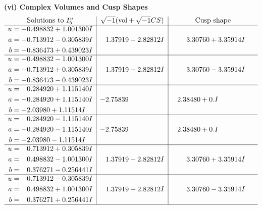 \documentclass[1p]{elsarticle_modified}
\theoremstyle{definition}
\newcommand{\I}{\sqrt{-1}}
\begin{document}
\newpage\flushleft \textbf{(vi) Complex Volumes and Cusp Shapes}
$$\begin{array}{c|c|c}  
\text{Solutions to }I^u_{5}& \I (\text{vol} + \sqrt{-1}CS) & \text{Cusp shape}\\
 \hline 
\begin{aligned}
u &= -0.498832 + 1.001300 I \\
a &= -0.713912 - 0.305839 I \\
b &= -0.836473 + 0.439023 I\end{aligned}
 & \phantom{-}1.37919 - 2.82812 I & \phantom{-}3.30760 + 3.35914 I \\ \hline\begin{aligned}
u &= -0.498832 - 1.001300 I \\
a &= -0.713912 + 0.305839 I \\
b &= -0.836473 - 0.439023 I\end{aligned}
 & \phantom{-}1.37919 + 2.82812 I & \phantom{-}3.30760 - 3.35914 I \\ \hline\begin{aligned}
u &= \phantom{-}0.284920 + 1.115140 I \\
a &= -0.284920 + 1.115140 I \\
b &= -2.03980 + 1.11514 I\end{aligned}
 & -2.75839\phantom{ +0.000000I} & \phantom{-}2.38480 + 0. I\phantom{ +0.000000I} \\ \hline\begin{aligned}
u &= \phantom{-}0.284920 - 1.115140 I \\
a &= -0.284920 - 1.115140 I \\
b &= -2.03980 - 1.11514 I\end{aligned}
 & -2.75839\phantom{ +0.000000I} & \phantom{-}2.38480 + 0. I\phantom{ +0.000000I} \\ \hline\begin{aligned}
u &= \phantom{-}0.713912 + 0.305839 I \\
a &= \phantom{-}0.498832 - 1.001300 I \\
b &= \phantom{-}0.376271 - 0.256441 I\end{aligned}
 & \phantom{-}1.37919 - 2.82812 I & \phantom{-}3.30760 + 3.35914 I \\ \hline\begin{aligned}
u &= \phantom{-}0.713912 - 0.305839 I \\
a &= \phantom{-}0.498832 + 1.001300 I \\
b &= \phantom{-}0.376271 + 0.256441 I\end{aligned}
 & \phantom{-}1.37919 + 2.82812 I & \phantom{-}3.30760 - 3.35914 I\\
 \hline 
 \end{array}$$\newpage
\end{document}
